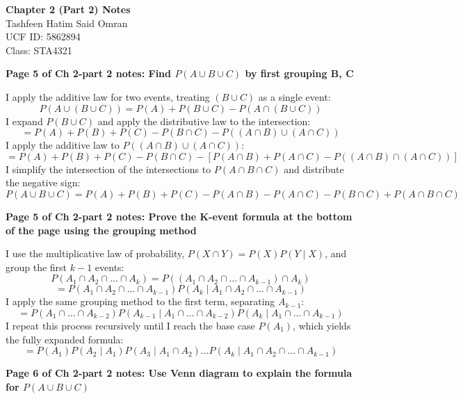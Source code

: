 \documentclass[11pt]{article}
\begin{document}
\begin{center}
    \textbf{\Large Chapter 2 (Part 2) Notes}\\
    \vspace{0.2cm}
    Tashfeen Hatim Said Omran\\
    UCF ID: 5862894\\
    Class: STA4321
\end{center}

\vspace{0.5cm}

\textbf{\large Page 5 of Ch 2-part 2 notes: Find $P(A \cup B \cup C)$ by first grouping B, C}

I apply the additive law for two events, treating $(B \cup C)$ as a single event:
\[
P(A \cup (B \cup C)) = P(A) + P(B \cup C) - P(A \cap (B \cup C))
\]
I expand $P(B \cup C)$ and apply the distributive law to the intersection:
\[
= P(A) + P(B) + P(C) - P(B \cap C) - P((A \cap B) \cup (A \cap C))
\]
I apply the additive law to $P((A \cap B) \cup (A \cap C))$:
\[
= P(A) + P(B) + P(C) - P(B \cap C) - [P(A \cap B) + P(A \cap C) - P((A \cap B) \cap (A \cap C))]
\]
I simplify the intersection of the intersections to $P(A \cap B \cap C)$ and distribute the negative sign:
\[
P(A \cup B \cup C) = P(A) + P(B) + P(C) - P(A \cap B) - P(A \cap C) - P(B \cap C) + P(A \cap B \cap C)
\]

\vspace{0.5cm}

\textbf{\large Page 5 of Ch 2-part 2 notes: Prove the K-event formula at the bottom of the page using the grouping method}

I use the multiplicative law of probability, $P(X \cap Y) = P(X)P(Y \mid X)$, and group the first $k-1$ events:
\[
P(A_1 \cap A_2 \cap \dots \cap A_k) = P((A_1 \cap A_2 \cap \dots \cap A_{k-1}) \cap A_k)
\]
\[
= P(A_1 \cap A_2 \cap \dots \cap A_{k-1}) P(A_k \mid A_1 \cap A_2 \cap \dots \cap A_{k-1})
\]
I apply the same grouping method to the first term, separating $A_{k-1}$:
\[
= P(A_1 \cap \dots \cap A_{k-2}) P(A_{k-1} \mid A_1 \cap \dots \cap A_{k-2}) P(A_k \mid A_1 \cap \dots \cap A_{k-1})
\]
I repeat this process recursively until I reach the base case $P(A_1)$, which yields the fully expanded formula:
\[
= P(A_1) P(A_2 \mid A_1) P(A_3 \mid A_1 \cap A_2) \dots P(A_k \mid A_1 \cap A_2 \cap \dots \cap A_{k-1})
\]

\vspace{0.5cm}

\textbf{\large Page 6 of Ch 2-part 2 notes: Use Venn diagram to explain the formula for $P(A \cup B \cup C)$}
\end{document}

